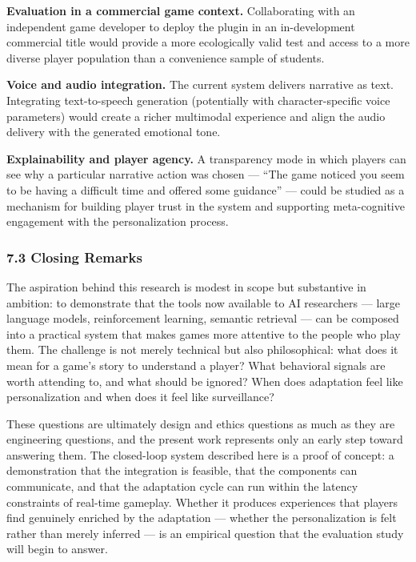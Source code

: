 \textbf{Evaluation in a commercial game context.} Collaborating with an
independent game developer to deploy the plugin in an in-development
commercial title would provide a more ecologically valid test and access
to a more diverse player population than a convenience sample of
students.

\textbf{Voice and audio integration.} The current system delivers
narrative as text. Integrating text-to-speech generation (potentially
with character-specific voice parameters) would create a richer
multimodal experience and align the audio delivery with the generated
emotional tone.

\textbf{Explainability and player agency.} A transparency mode in which
players can see why a particular narrative action was chosen --- ``The
game noticed you seem to be having a difficult time and offered some
guidance'' --- could be studied as a mechanism for building player trust
in the system and supporting meta-cognitive engagement with the
personalization process.

\subsubsection{7.3 Closing Remarks}\label{closing-remarks}

The aspiration behind this research is modest in scope but substantive
in ambition: to demonstrate that the tools now available to AI
researchers --- large language models, reinforcement learning, semantic
retrieval --- can be composed into a practical system that makes games
more attentive to the people who play them. The challenge is not merely
technical but also philosophical: what does it mean for a game's story
to understand a player? What behavioral signals are worth attending to,
and what should be ignored? When does adaptation feel like
personalization and when does it feel like surveillance?

These questions are ultimately design and ethics questions as much as
they are engineering questions, and the present work represents only an
early step toward answering them. The closed-loop system described here
is a proof of concept: a demonstration that the integration is feasible,
that the components can communicate, and that the adaptation cycle can
run within the latency constraints of real-time gameplay. Whether it
produces experiences that players find genuinely enriched by the
adaptation --- whether the personalization is felt rather than merely
inferred --- is an empirical question that the evaluation study will
begin to answer.

